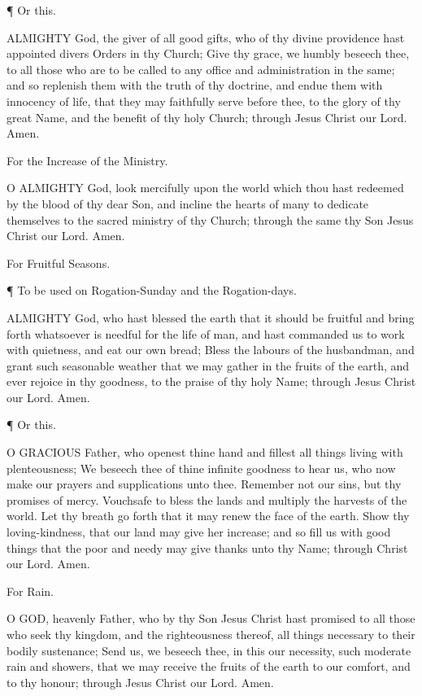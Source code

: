 ¶ Or this.

ALMIGHTY God, the giver of all good gifts, who of thy divine providence hast appointed divers Orders in thy Church; Give thy grace, we humbly beseech thee, to all those who are to be called to any office and administration in the same; and so replenish them with the truth of thy doctrine, and endue them with innocency of life, that they may faithfully serve before thee, to the glory of thy great Name, and the benefit of thy holy Church; through Jesus Christ our Lord. Amen.

For the Increase of the Ministry.

O ALMIGHTY God, look mercifully upon the world which thou hast redeemed by the blood of thy dear Son, and incline the hearts of many to dedicate themselves to the sacred ministry of thy Church; through the same thy Son Jesus Christ our Lord. Amen.

For Fruitful Seasons.

¶ To be used on Rogation-Sunday and the Rogation-days.

ALMIGHTY God, who hast blessed the earth that it should be fruitful and bring forth whatsoever is needful for the life of man, and hast commanded us to work with quietness, and eat our own bread; Bless the labours of the husbandman, and grant such seasonable weather that we may gather in the fruits of the earth, and ever rejoice in thy goodness, to the praise of thy holy Name; through Jesus Christ our Lord. Amen.

¶ Or this.

O GRACIOUS Father, who openest thine hand and fillest all things living with plenteousness; We beseech thee of thine infinite goodness to hear us, who now make our prayers and supplications unto thee. Remember not our sins, but thy promises of mercy. Vouchsafe to bless the lands and multiply the harvests of the world. Let thy breath go forth that it may renew the face of the earth. Show thy loving-kindness, that our land may give her increase; and so fill us with good things that the poor and needy may give thanks unto thy Name; through Christ our Lord. Amen.

For Rain.

O GOD, heavenly Father, who by thy Son Jesus Christ hast promised to all those who seek thy kingdom, and the righteousness thereof, all things necessary to their bodily sustenance; Send us, we beseech thee, in this our necessity, such moderate rain and showers, that we may receive the fruits of the earth to our comfort, and to thy honour; through Jesus Christ our Lord. Amen.

